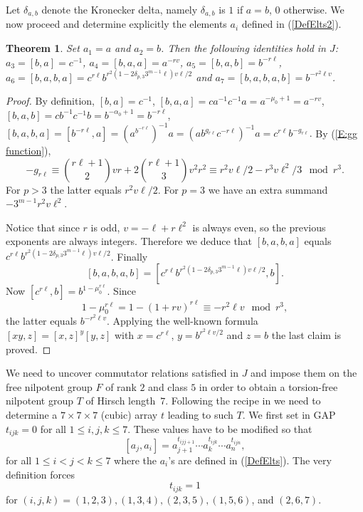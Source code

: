\documentclass{amsart}
\newtheorem{theorem}{Theorem}[section]
\theoremstyle{definition}
\theoremstyle{remark}
\begin{document}
{ Let $\delta_{a,b}$ denote the Kronecker delta, namely $\delta_{a,b}$ is $1$ if $a=b$, $0$ otherwise.
 We now proceed and determine explicitly the elements $a_i$ defined in (\ref{DefElts2}).

\begin{theorem}\label{Basic Commutators}
Set $a_1=a$ and $a_2=b$. Then the following identities hold in $J$: $a_3=[b,a]=c^{-1}$, $a_4=[b,a,a]=a^{-rv}$, $a_5=[b,a,b]=b^{-r\ell}$,
$a_6=[b,a,b,a]=c^{r\ell}b^{r^2(1-2\delta_{p,3}3^{m-1}\ell)v\ell /2}$
and $a_7=[b,a,b,a,b]=b^{-r^2\ell v}$.
\end{theorem}

\begin{proof}
By definition, $[b,a]=c^{-1}$, $[b,a,a]=ca^{-1}c^{-1}a=a^{-\mu_0+1}=a^{-rv}$, $[b,a,b]=cb^{-1}c^{-1}b=b^{-\alpha_0+1}=b^{-r\ell}$,
 $
 [b,a,b,a]=[b^{-r\ell},a]=(a^{b^{-r\ell}})^{-1}a=(ab^{g_{r\ell}}c^{-r\ell})^{-1}a=c^{r\ell}b^{-g_{r\ell}}.
 $
By (\ref{E:gg function}),
 $$
 -g_{r\ell}\equiv \binom{r\ell+1}{2}vr+2\binom{r\ell+1}{3}v^2r^2\equiv r^2v\ell/2-r^3v\ell^2/3\mod r^3.
 $$
 For $p>3$ the latter equals $r^2v\ell/2$. For $p=3$ we have an extra summand $-3^{m-1}r^2v\ell^2${\color{red}.}
 
Notice that since $r$ is odd, $v=-\ell+r\ell^2$ is always even, so the previous exponents are always integers. Therefore we deduce that $[b,a,b,a]$ equals
 $c^{r\ell}b^{r^2(1-2\delta_{p,3}3^{m-1}\ell)v\ell /2}$. Finally 
 $$[b,a,b,a,b]=[c^{r\ell}b^{r^2(1-2\delta_{p,3}3^{m-1}\ell)v\ell /2},b].$$
 Now $[c^{r\ell},b]=b^{1-\mu_0^{r\ell}}$. Since
 $$
 1-\mu_0^{r\ell}=1-(1+rv)^{r\ell}\equiv -r^2\ell v\mod r^3,
 $$
 the latter equals $b^{-r^2\ell v}$. Applying the well-known formula $[xy,z]=[x,z]^y[y,z]$ with $x=c^{r\ell}$, $y=b^{r^2\ell v/2}$ and $z=b$ the last claim is proved.
\end{proof}

We need to uncover commutator relations satisfied in $J$ and impose them 
on the free nilpotent group $F$ of rank $2$ and class $5$ in order to 
obtain a torsion-free nilpotent group $T$ of Hirsch length~$7$.
Following the recipe in \cite{CE} we need to determine a $7\times 7\times 7$ (cubic) array $t$ leading to such $T$.
We first set in GAP $t_{ijk}=0$ for all $1\le i,j,k\le 7$. These values have to be modified so that
$$
[a_j,a_i]=a_{j+1}^{t_{ijj+1}}\cdots a_k^{t_{ijk}}\cdots a_n^{t_{ijn}},
$$
for all $1\le i<j<k\le 7$ where the $a_i$'s are defined in (\ref{DefElts}).
The very definition forces
$$
t_{ijk}=1
$$ 
for $(i,j,k)=(1,2,3),(1,3,4),(2,3,5),(1,5,6)$, and $(2,6,7)$.


}
\end{document}
